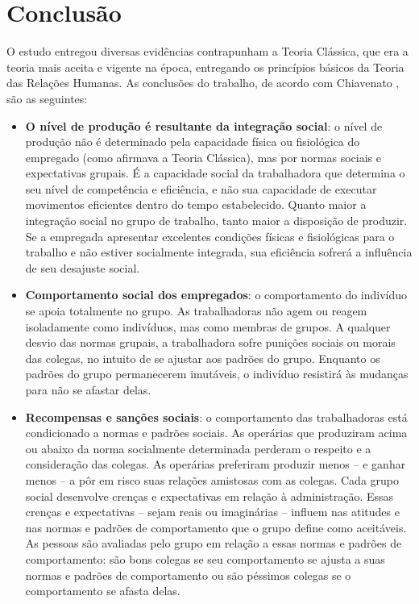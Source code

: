 \section{
    Conclusão
    }

\setlength{\parindent}{4em}
\setlength{\parskip}{0.5em}
\renewcommand{\baselinestretch}{1}

O estudo entregou diversas evidências contrapunham a Teoria Clássica, que era a teoria mais aceita e vigente na época, entregando os princípios básicos da Teoria das Relações Humanas. As conclusões do trabalho, de acordo com Chiavenato \cite{chiavenato2003introduccao}, são as seguintes:

\begin{itemize}
	\item \textbf{O nível de produção é resultante da integração social}: o nível de produção não é determinado pela capacidade física ou fisiológica do empregado (como afirmava a Teoria Clássica), mas por normas sociais e expectativas grupais. É a capacidade social da
	trabalhadora que determina o seu nível de competência e eficiência, e não sua capacidade de executar movimentos eficientes dentro do tempo estabelecido. Quanto maior a integração social no grupo de trabalho, tanto maior a disposição de produzir. Se a empregada apresentar excelentes condições físicas e fisiológicas para o trabalho e não estiver socialmente integrada, sua eficiência sofrerá a influência de seu
	desajuste social.
	
	\item \textbf{Comportamento social dos empregados}: o comportamento do indivíduo se apoia totalmente no grupo. As trabalhadoras não agem ou reagem isoladamente como indivíduos, mas como membras de grupos. A qualquer desvio das normas grupais, a trabalhadora sofre punições sociais ou morais das colegas, no intuito de se ajustar aos padrões do grupo. Enquanto os padrões do grupo permanecerem imutáveis, o indivíduo resistirá às mudanças para não se afastar delas.
	
	\item \textbf{Recompensas e sanções sociais}: o comportamento das trabalhadoras está condicionado a normas e padrões sociais. As operárias que	produziram acima ou abaixo da norma socialmente determinada perderam o respeito e a consideração das colegas. As operárias preferiram produzir menos – e ganhar menos – a pôr em risco suas relações amistosas com as colegas. Cada grupo social desenvolve crenças e expectativas em relação à administração. Essas crenças e expectativas – sejam reais ou imaginárias – influem nas atitudes e nas normas e padrões de comportamento que o grupo define como aceitáveis. As pessoas são avaliadas pelo grupo em relação a essas normas e padrões de comportamento: são bons colegas se seu comportamento se ajusta a suas normas e padrões de comportamento ou são péssimos colegas se o comportamento se afasta delas.
	

\end{itemize}
